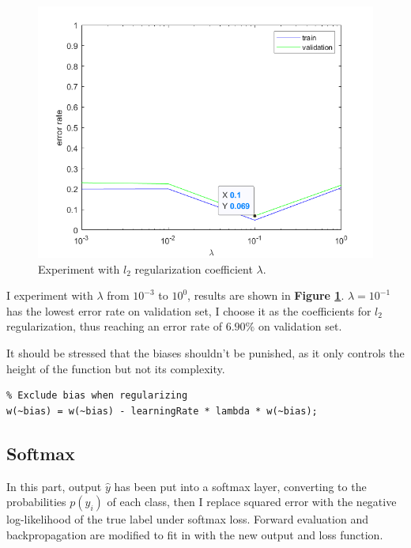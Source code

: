 \documentclass{article}
\begin{document}
\begin{figure}[H]
	\centering
	\includegraphics[scale=0.5]{figure5}
	\caption{Experiment with $l_2$ regularization coefficient $\lambda$.}
	\label{fig5}
\end{figure}

I experiment with $\lambda$ from $10^{-3}$ to $10^{0}$, results are shown in \textbf{Figure \ref{fig5}}. $\lambda=10^{-1}$ has the lowest error rate on validation set, I choose it as the coefficients for $l_2$ regularization, thus reaching an error rate of $6.90\%$ on validation set.

\begin{info}[Notice]
It should be stressed that the biases shouldn't be punished, as it only controls the height of the function but not its complexity.
\end{info}

\begin{lstlisting}
% Exclude bias when regularizing
w(~bias) = w(~bias) - learningRate * lambda * w(~bias);
\end{lstlisting}


\subsection{Softmax}

In this part, output $\hat{y}$ has been put into a softmax layer, converting to the probabilities $p(y_i)$ of each class, then I replace squared error with the negative log-likelihood of the true label under softmax loss. Forward evaluation and backpropagation are modified to fit in with the new output and loss function.
\end{document}
